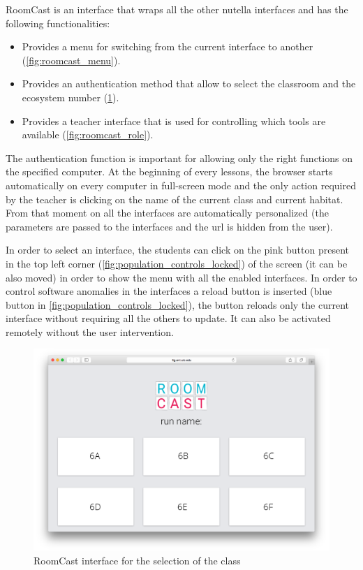 RoomCast is an interface that wraps all the other nutella interfaces and has the following functionalities:
\begin{itemize}
\item Provides a menu for switching from the current interface to another (\ref{fig:roomcast_menu}).
\item Provides an authentication method that allow to select the classroom and the ecosystem number (\ref{fig:roomcast_classroom}).
\item Provides a teacher interface that is used for controlling which tools are available (\ref{fig:roomcast_role}).
\end{itemize}
The authentication function is important for allowing only the right functions on the specified computer. At the beginning of every lessons, the browser starts automatically on every computer in full-screen mode and the only action required by the teacher is clicking on the name of the current class and current habitat. From that moment on all the interfaces are automatically personalized (the parameters are passed to the interfaces and the url is hidden from the user).

In order to select an interface, the students can click on the pink button present in the top left corner (\ref{fig:population_controls_locked}) of the screen (it can be also moved) in order to show the menu with all the enabled interfaces. In order to control software anomalies in the interfaces a reload button is inserted (blue button in \ref{fig:population_controls_locked}), the button reloads only the current interface without requiring all the others to update. It can also be activated remotely without the user intervention.

\begin{figure}
\centering
\includegraphics[width=4.5in]{images/room-cast-classroom-selection.png}
\caption{RoomCast interface for the selection of the class}
\label{fig:roomcast_classroom}
\end{figure}

